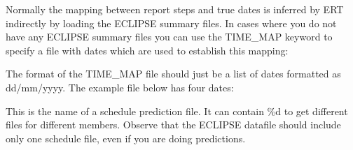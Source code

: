 \documentclass[a4paper,10pt,english]{sphinxmanual}
\begin{document}
\label{\detokenize{keywords/index:time-map}}
\begin{sphinxShadowBox}

Normally the mapping between report steps and true dates is inferred by
ERT indirectly by loading the ECLIPSE summary files. In cases where you
do not have any ECLIPSE summary files you can use the TIME\_MAP keyword
to specify a file with dates which are used to establish this mapping:


%
\begin{sphinxVerbatim}[commandchars=\\\{\}]
         
 
\end{sphinxVerbatim}

The format of the TIME\_MAP file should just be a list of dates formatted as
dd/mm/yyyy. The example file below has four dates:

%
\begin{sphinxVerbatim}[commandchars=\\\{\}]
\end{sphinxVerbatim}
\end{sphinxShadowBox}
\label{\detokenize{keywords/index:schedule-prediction-file}}
\begin{sphinxShadowBox}

This is the name of a schedule prediction file. It can contain \%d to get
different files for different members. Observe that the ECLIPSE datafile
should include only one schedule file, even if you are doing predictions.
\end{sphinxShadowBox}
\end{document}
